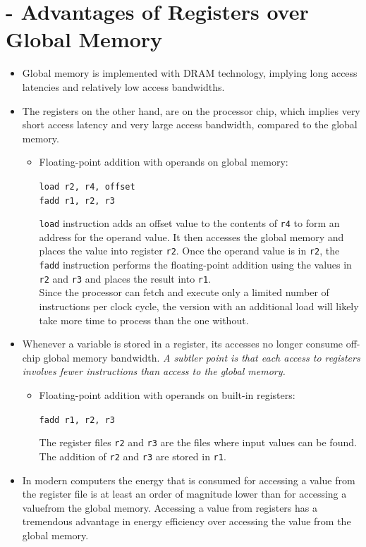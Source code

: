 \section{- Advantages of Registers over Global Memory}
\begin{itemize}
      \item Global memory is implemented with DRAM technology, implying long access latencies and relatively low access bandwidths.
      \item The registers on the other hand, are on the processor chip, which implies very short access latency and very large access bandwidth, compared to the global memory.
            \begin{itemize}
                  \item Floating-point addition with operands on global memory:
                        \begin{center}
                              \texttt{load r2, r4, offset}\\
                              \texttt{fadd r1, r2, r3}
                        \end{center}
                        \texttt{load} instruction adds an offset value to the contents of \texttt{r4} to form an address for the operand value. It then accesses the global memory and places the value into register \texttt{r2}. Once the operand value is in \texttt{r2}, the \texttt{fadd} instruction performs the floating-point addition using the values in \texttt{r2} and \texttt{r3} and places the result into \texttt{r1}.\\
                        Since the processor can fetch and execute only a limited number of instructions per clock cycle, the version with an additional load will likely take more time to process than the one without.
            \end{itemize}
      \item Whenever a variable is stored in a register, its accesses no longer consume off-chip global memory bandwidth. \textsl{A subtler point is that each access to registers involves fewer instructions than access to the global memory.}
            \begin{itemize}
                  \item Floating-point addition with operands on built-in registers:
                        \begin{center}
                              \texttt{fadd r1, r2, r3}
                        \end{center}
                        The register files \texttt{r2} and \texttt{r3} are the files where input values can be found. The addition of \texttt{r2} and \texttt{r3} are stored in \texttt{r1}.
            \end{itemize}
      \item In modern computers the energy that is consumed for accessing a value from the register file is at least an order of magnitude lower than for accessing a valuefrom the global memory. Accessing a value from registers has a tremendous advantage
            in energy efficiency over accessing the value from the global memory.
\end{itemize}

